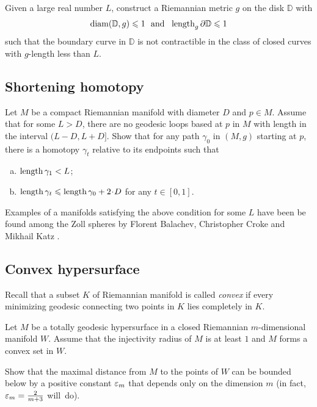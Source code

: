 \begin{pr}
Given a large real number $L$,
construct a Riemannian metric $g$ on the disk $\mathbb D$ 
with 
\[\diam(\mathbb D,g)\le 1
\ \ 
\text{and}
\ \ 
\length_g \partial\mathbb D\le 1  \]
such that the boundary curve in $\mathbb D$ is not contractible in the class of closed curves with $g$-length less than $L$.
\end{pr}

\subsection*{Shortening homotopy}
\label{short-homotopy}

\begin{pr}
Let $M$ be a compact Riemannian manifold with diameter $D$ and $p\in M$.
Assume that for some $L>D$,
there are no geodesic loops based at $p$ in $M$
with length in the interval $(L-D,L+ D]$.
Show that for any path $\gamma_0$ in $(M,g)$ starting at $p$, 
there is a homotopy $\gamma_t$ relative to its endpoints
such that 
\begin{enumerate}[a)]
\item $\operatorname{\rm length} \gamma_1<L$;
\item $\length \gamma_t\le \length \gamma_0+2\cdot D$ for any $t\in[0,1]$.
 
\end{enumerate}
\end{pr}

Examples of a manifolds satisfying the above condition for some $L$ have been be found among the Zoll spheres
by Florent Balachev, Christopher Croke and Mikhail Katz \cite{balacheff-croke-katz}.



\subsection*{Convex hypersurface}
\label{Convex hypersurface}

Recall that a subset $K$ of Riemannian manifold is called \emph{convex} if every minimizing geodesic connecting two  points in $K$ lies completely in $K$. 

\begin{pr}
Let $M$ be a totally geodesic hypersurface 
in a closed Riemannian $m$-dimensional manifold $W$.
Assume that the injectivity radius of $M$ is at least $1$
and $M$ forms a convex set in $W$.

Show that the maximal distance from $M$ to the points of $W$ can be bounded below by a positive constant $\varepsilon_m$ that depends only on the dimension $m$ (in fact, $\varepsilon_m=\tfrac2{m+3}$ will~do).
\end{pr}

